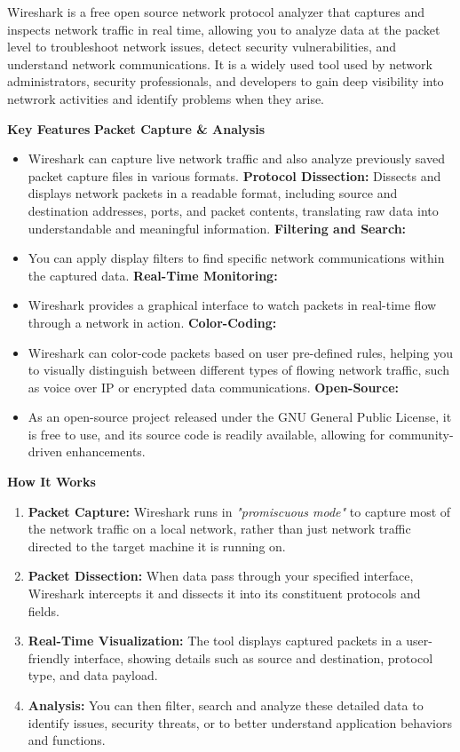 \begin{notebox}
    Wireshark is a free open source network protocol analyzer that captures and inspects network traffic in real time, allowing you to analyze data at the packet level to troubleshoot network issues, detect security vulnerabilities, and understand network communications. It is a widely used tool used by network administrators, security professionals, and developers to gain deep visibility into netwrork activities and identify problems when they arise.

\textbf{Key Features}
\textbf{Packet Capture \& Analysis}
\begin{itemize}
    \item Wireshark can capture live network traffic and also analyze previously saved packet capture files in various formats.
\textbf{Protocol Dissection:}
Dissects and displays network packets in a readable format, including source and destination addresses, ports, and packet contents, translating raw data into understandable and meaningful information.
\textbf{Filtering and Search:}
\item You can apply display filters to find specific network communications within the captured data.
\textbf{Real-Time Monitoring:}
\item Wireshark provides a graphical interface to watch packets in real-time flow through a network in action.
\textbf{Color-Coding:}
\item Wireshark can color-code packets based on user pre-defined rules, helping you to visually distinguish between different types of flowing network traffic, such as voice over IP or encrypted data communications.
\textbf{Open-Source:}
\item As an open-source project released under the GNU General Public License, it is free to use, and its source code is readily available, allowing for community-driven enhancements.
\end{itemize}

\textbf{How It Works}
\begin{enumerate}
    \item \textbf{Packet Capture:} Wireshark runs in \textit{"promiscuous mode"} to capture most of the network traffic on a local network, rather than just network traffic directed to the target machine it is running on.
    \item \textbf{Packet Dissection:} When data pass through your specified interface, Wireshark intercepts it and dissects it into its constituent protocols and fields.
    \item \textbf{Real-Time Visualization:} The tool displays captured packets in a user-friendly interface, showing details such as source and destination, protocol type, and data payload.
    \item \textbf{Analysis:} You can then filter, search and analyze these detailed data to identify issues, security threats, or to better understand application behaviors and functions.
\end{enumerate}
\end{notebox}



